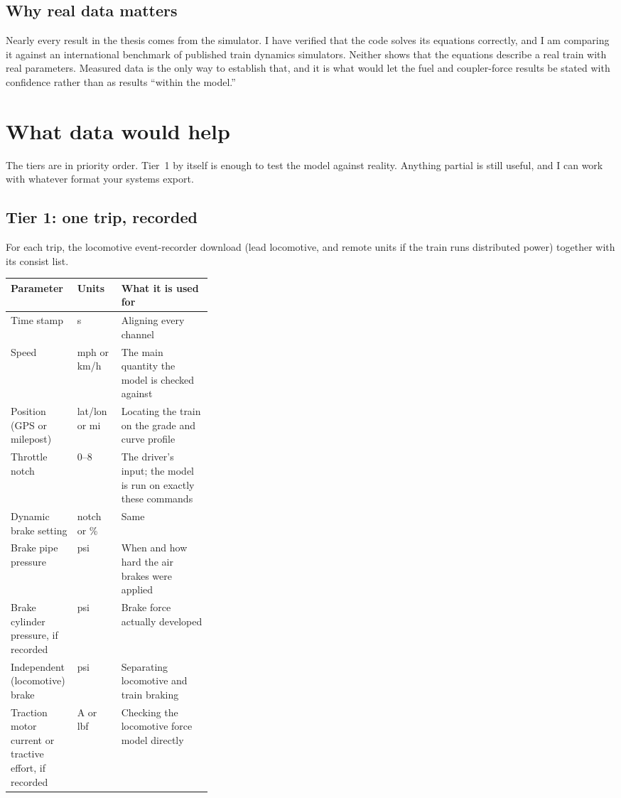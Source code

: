 \documentclass[11pt]{article}
\begin{document}
\subsection*{Why real data matters}

Nearly every result in the thesis comes from the simulator. I have verified
that the code solves its equations correctly, and I am comparing it against
an international benchmark of published train dynamics simulators. Neither
shows that the equations describe a real train with real parameters. Measured
data is the only way to establish that, and it is what would let the fuel and
coupler-force results be stated with confidence rather than as results
``within the model.''

\section*{What data would help}
\label{sec:data}

The tiers are in priority order. Tier~1 by itself is enough to test the model
against reality. Anything partial is still useful, and I can work with
whatever format your systems export.

\subsection*{Tier 1: one trip, recorded}

For each trip, the locomotive event-recorder download (lead locomotive, and
remote units if the train runs distributed power) together with its consist
list.

\smallskip
\begin{tabularx}{\linewidth}{@{}>{\raggedright\arraybackslash}p{0.33\linewidth} l L@{}}
\toprule
\textbf{Parameter} & \textbf{Units} & \textbf{What it is used for} \\
\midrule
Time stamp & s & Aligning every channel \\
Speed & mph or km/h & The main quantity the model is checked against \\
Position (GPS or milepost) & lat/lon or mi & Locating the train on the grade and curve profile \\
Throttle notch & 0--8 & The driver's input; the model is run on exactly these commands \\
Dynamic brake setting & notch or \% & Same \\
Brake pipe pressure & psi & When and how hard the air brakes were applied \\
Brake cylinder pressure, if recorded & psi & Brake force actually developed \\
Independent (locomotive) brake & psi & Separating locomotive and train braking \\
Traction motor current or tractive effort, if recorded & A or lbf & Checking the locomotive force model directly \\
\bottomrule
\end{tabularx}
\end{document}
